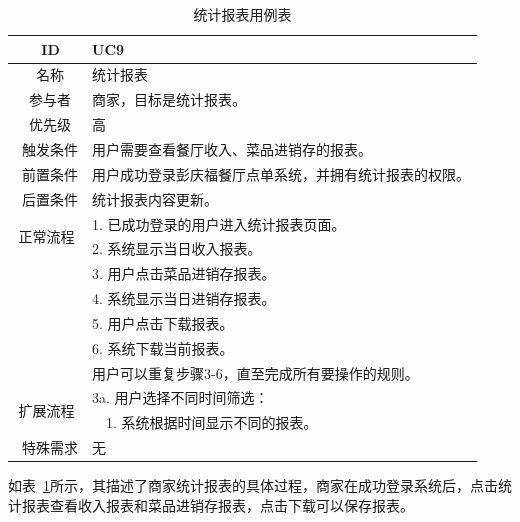 \begin{table}[htbp!]
  \footnotesize
  \centering
  \caption{统计报表用例表}
  \vspace{2mm}
  \begin{tabular}{cp{11.5cm}}
   \hline
   \ ID & UC9 \\ 
   \hline
   \ 名称 & 统计报表 \\ 
   \hline
   \ 参与者 & 商家，目标是统计报表。 \\ 
   \hline
   \ 优先级 & 高 \\ 
   \hline
   \ 触发条件 & 用户需要查看餐厅收入、菜品进销存的报表。 \\ 
   \hline
   \ 前置条件 & 用户成功登录彭庆福餐厅点单系统，并拥有统计报表的权限。 \\ 
   \hline
   \ 后置条件 & 统计报表内容更新。 \\ 
   \hline
   \multirow{2}{*}{正常流程}
    & 1.	已成功登录的用户进入统计报表页面。\\
    & 2.	系统显示当日收入报表。\\
    & 3.	用户点击菜品进销存报表。\\
    & 4.	系统显示当日进销存报表。\\
    & 5.  用户点击下载报表。\\
    & 6.  系统下载当前报表。\\
    & 用户可以重复步骤3-6，直至完成所有要操作的规则。\\
   \hline
   \multirow{2}{*}{扩展流程}
    & 3a. 用户选择不同时间筛选：\\
    & ~~1.	系统根据时间显示不同的报表。\\
  \hline
  \ 特殊需求 & 无 \\ 
  \hline
  \end{tabular}
  \label{table:uc8}
\end{table}

如表~\ref{table:uc8}所示，其描述了商家统计报表的具体过程，商家在成功登录系统后，点击统计报表查看收入报表和菜品进销存报表，点击下载可以保存报表。\\

